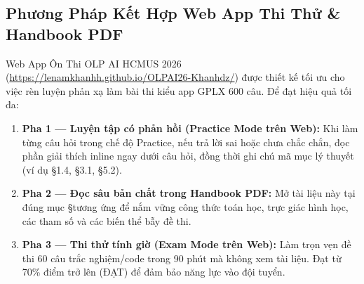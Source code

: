 \documentclass[10pt,a4paper]{article}
\begin{document}
\subsection{Phương Pháp Kết Hợp Web App Thi Thử \& Handbook PDF}
Web App Ôn Thi OLP AI HCMUS 2026 (\url{https://lenamkhanhh.github.io/OLPAI26-Khanhdz/}) được thiết kế tối ưu cho việc rèn luyện phản xạ làm bài thi kiểu app GPLX 600 câu. Để đạt hiệu quả tối đa:
\begin{enumerate}[leftmargin=*]
    \item \textbf{Pha 1 --- Luyện tập có phản hồi (Practice Mode trên Web):} Khi làm từng câu hỏi trong chế độ Practice, nếu trả lời sai hoặc chưa chắc chắn, đọc phần giải thích inline ngay dưới câu hỏi, đồng thời ghi chú mã mục lý thuyết (ví dụ \S1.4, \S3.1, \S5.2).
    \item \textbf{Pha 2 --- Đọc sâu bản chất trong Handbook PDF:} Mở tài liệu này tại đúng mục \S tương ứng để nắm vững công thức toán học, trực giác hình học, các tham số và các biến thể bẫy đề thi.
    \item \textbf{Pha 3 --- Thi thử tính giờ (Exam Mode trên Web):} Làm trọn vẹn đề thi 60 câu trắc nghiệm/code trong 90 phút mà không xem tài liệu. Đạt từ 70\% điểm trở lên (ĐẠT) để đảm bảo năng lực vào đội tuyển.
\end{enumerate}
\end{document}
